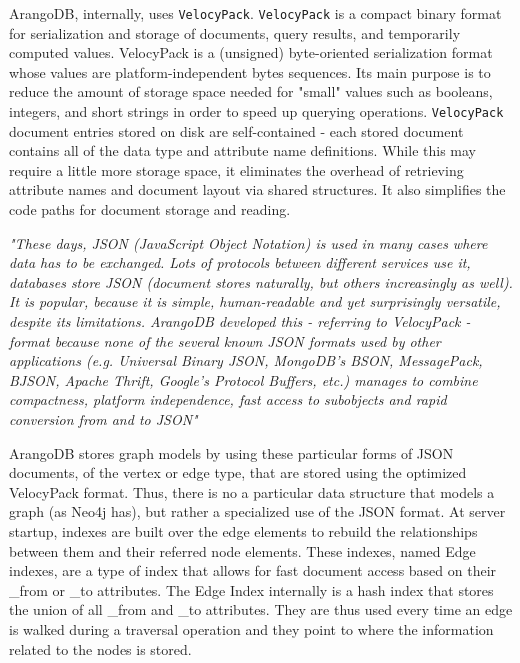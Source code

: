 ArangoDB, internally, uses \texttt{VelocyPack}.
\texttt{VelocyPack} is a compact binary format for serialization and storage of documents, query results, and temporarily computed values.
VelocyPack is a (unsigned) byte-oriented serialization format whose values are platform-independent bytes sequences.
Its main purpose is to reduce the amount of storage space needed for "small" values such as booleans, integers, and short strings in order to speed up querying operations.
\texttt{VelocyPack} document entries stored on disk are self-contained - each stored document contains all of the data type and attribute name definitions.
While this may require a little more storage space, it eliminates the overhead of retrieving attribute names and document layout via shared structures.
It also simplifies the code paths for document storage and reading.

\begin{quoting}[
	begintext={},
	endtext={ - on the reason why ArangoDB developed VelocyPack\sfcite{ArangoDBVelocityPack2021}}
]
	\textit{
		"These days, JSON (JavaScript Object Notation) is used in many cases where data has to be exchanged.
		Lots of protocols between different services use it, databases store JSON (document stores naturally, but others increasingly as well).
		It is popular, because it is simple, human-readable and yet surprisingly versatile, despite its limitations.
		ArangoDB developed this \textnormal{- referring to VelocyPack -} format because none of the several known JSON formats used by other applications (e.g. Universal Binary JSON, MongoDB's BSON, MessagePack, BJSON, Apache Thrift, Google's Protocol Buffers, etc.) manages to combine compactness, platform independence, fast access to subobjects and rapid conversion from and to JSON"
	}
\end{quoting}

ArangoDB stores graph models by using these particular forms of JSON documents, of the vertex or edge type, that are stored using the optimized VelocyPack format.
Thus, there is no a particular data structure that models a graph (as Neo4j has), but rather a specialized use of the JSON format.
At server startup, indexes are built over the edge elements to rebuild the relationships between them and their referred node elements.
These indexes, named Edge indexes, are a type of index that allows for fast document access based on their \_from or \_to attributes.
The Edge Index internally is a hash index that stores the union of all \_from and \_to attributes.
They are thus used every time an edge is walked during a traversal operation and they point to where the information related to the nodes is stored.

